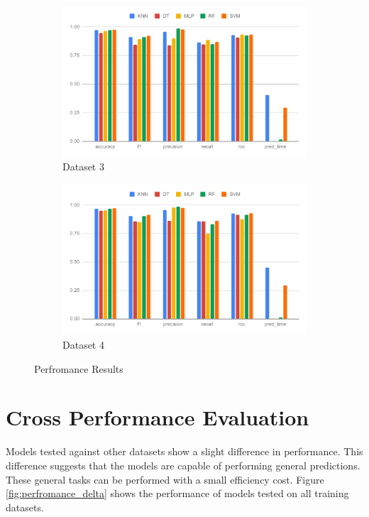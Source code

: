 \begin{figure}[H]
\begin{subfigure}{.5\columnwidth}
    \includegraphics[width=0.9\columnwidth]{media/data/performance/perf_ds_3.pdf}
    \caption{Dataset 3}
    \label{fig:perfromance_results_dataset_3}
  \end{subfigure}%
  \begin{subfigure}{.5\columnwidth}
    \centering
    \includegraphics[width=0.9\columnwidth]{media/data/performance/perf_ds_4.pdf}
    \caption{Dataset 4}
    \label{fig:perfromance_results_dataset_4}
  \end{subfigure}
  \caption{Perfromance Results}
  \label{fig:perfromance_results}
\end{figure}

\section{Cross Performance Evaluation} \label{sec:cross_performance_evaluation}

Models tested against other datasets show a slight difference in performance. This difference suggests that the models are capable of performing general predictions. These general tasks can be performed with a small efficiency cost. Figure \ref{fig:perfromance_delta} shows the performance of models tested on all training datasets.

